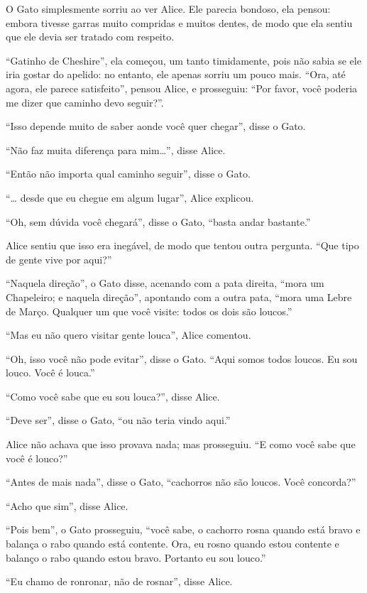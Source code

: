 O Gato simplesmente sorriu ao ver Alice. Ele parecia bondoso, ela
pensou: embora tivesse garras muito compridas e muitos dentes, de modo
que ela sentiu que ele devia ser tratado com respeito.

``Gatinho de Cheshire'', ela começou, um tanto timidamente, pois não
sabia se ele iria gostar do apelido: no entanto, ele apenas sorriu um
pouco mais. ``Ora, até agora, ele parece satisfeito'', pensou Alice, e
prosseguiu: ``Por favor, você poderia me dizer que caminho devo
seguir?''.

``Isso depende muito de saber aonde você quer chegar'', disse o Gato.

``Não faz muita diferença para mim\ldots{}'', disse Alice.

``Então não importa qual caminho seguir'', disse o Gato.

``\ldots{} desde que eu chegue em algum lugar'', Alice explicou.

``Oh, sem dúvida você chegará'', disse o Gato, ``basta andar bastante.''

Alice sentiu que isso era inegável, de modo que tentou outra pergunta.
``Que tipo de gente vive por aqui?''

``Naquela direção'', o Gato disse, acenando com a pata direita, ``mora
um Chapeleiro; e naquela direção'', apontando com a outra pata, ``mora
uma Lebre de Março. Qualquer um que você visite: todos os dois são
loucos.''

``Mas eu não quero visitar gente louca'', Alice comentou.

``Oh, isso você não pode evitar'', disse o Gato. ``Aqui somos todos
loucos. Eu sou louco. Você é louca.''

``Como você sabe que eu sou louca?'', disse Alice.

``Deve ser'', disse o Gato, ``ou não teria vindo aqui.''

Alice não achava que isso provava nada; mas prosseguiu. ``E como você
sabe que você é louco?''

``Antes de mais nada'', disse o Gato, ``cachorros não são loucos. Você
concorda?''

``Acho que sim'', disse Alice.

``Pois bem'', o Gato prosseguiu, ``você sabe, o cachorro rosna quando
está bravo e balança o rabo quando está contente. Ora, eu rosno quando
estou contente e balanço o rabo quando estou bravo. Portanto eu sou
louco.''

``Eu chamo de ronronar, não de rosnar'', disse Alice.

